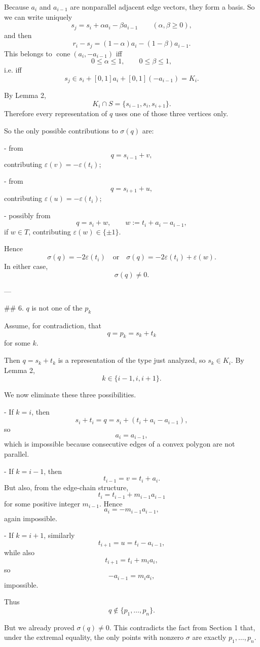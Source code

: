 Because \(a_i\) and \(a_{i-1}\) are nonparallel adjacent edge vectors, they form a basis. So we can write uniquely
\[
s_j=s_i+\alpha a_i-\beta a_{i-1}
\qquad (\alpha,\beta\ge 0),
\]
and then
\[
r_i-s_j=(1-\alpha)a_i-(1-\beta)a_{i-1}.
\]
This belongs to \(\operatorname{cone}(a_i,-a_{i-1})\) iff
\[
0\le \alpha\le 1,\qquad 0\le \beta\le 1,
\]
i.e. iff
\[
s_j\in s_i+[0,1]a_i+[0,1](-a_{i-1})=K_i.
\]

By Lemma 2,
\[
K_i\cap S=\{s_{i-1},s_i,s_{i+1}\}.
\]
Therefore every representation of \(q\) uses one of those three vertices only.

So the only possible contributions to \(\sigma(q)\) are:

- from
  \[
  q=s_{i-1}+v,
  \]
  contributing \(\varepsilon(v)=-\varepsilon(t_i)\);

- from
  \[
  q=s_{i+1}+u,
  \]
  contributing \(\varepsilon(u)=-\varepsilon(t_i)\);

- possibly from
  \[
  q=s_i+w,\qquad w:=t_i+a_i-a_{i-1},
  \]
  if \(w\in T\), contributing \(\varepsilon(w)\in\{\pm1\}\).

Hence
\[
\sigma(q)= -2\varepsilon(t_i)
\quad\text{or}\quad
\sigma(q)= -2\varepsilon(t_i)+\varepsilon(w).
\]
In either case,
\[
\sigma(q)\neq 0.
\]

---

## 6. \(q\) is not one of the \(p_k\)

Assume, for contradiction, that
\[
q=p_k=s_k+t_k
\]
for some \(k\).

Then \(q=s_k+t_k\) is a representation of the type just analyzed, so \(s_k\in K_i\). By Lemma 2,
\[
k\in\{i-1,i,i+1\}.
\]

We now eliminate these three possibilities.

- If \(k=i\), then
  \[
  s_i+t_i=q=s_i+(t_i+a_i-a_{i-1}),
  \]
  so
  \[
  a_i=a_{i-1},
  \]
  which is impossible because consecutive edges of a convex polygon are not parallel.

- If \(k=i-1\), then
  \[
  t_{i-1}=v=t_i+a_i.
  \]
  But also, from the edge-chain structure,
  \[
  t_i=t_{i-1}+m_{i-1}a_{i-1}
  \]
  for some positive integer \(m_{i-1}\). Hence
  \[
  a_i=-m_{i-1}a_{i-1},
  \]
  again impossible.

- If \(k=i+1\), similarly
  \[
  t_{i+1}=u=t_i-a_{i-1},
  \]
  while also
  \[
  t_{i+1}=t_i+m_i a_i,
  \]
  so
  \[
  -a_{i-1}=m_i a_i,
  \]
  impossible.

Thus
\[
q\notin \{p_1,\dots,p_n\}.
\]

But we already proved \(\sigma(q)\neq 0\). This contradicts the fact from Section 1 that, under the extremal equality, the only points with nonzero \(\sigma\) are exactly \(p_1,\dots,p_n\).

